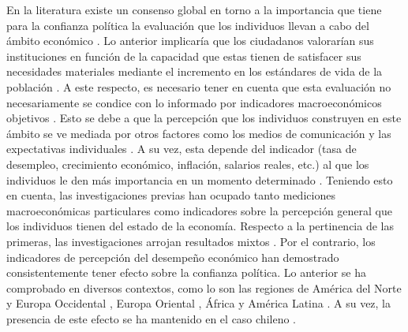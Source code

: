 \documentclass[12pt,twoside]{templates/facsothesis}
\begin{document}
En la literatura existe un consenso global en torno a la importancia que tiene para la confianza política la evaluación que los individuos llevan a cabo del ámbito económico \citep{eastonReassessmentConceptPolitical1975, leeEconomicPerformanceIncome2020, mishlerWhatAreOrigins2001, norrisDemocraticDeficitCritical2011, oskarssonGeneralizedTrustPolitical2010, vandermeerEconomicPerformancePolitical2018, wangGovernmentPerformanceCorruption2016}. Lo anterior implicaría que los ciudadanos valorarían sus instituciones en función de la capacidad que estas tienen de satisfacer sus necesidades materiales mediante el incremento en los estándares de vida de la población \citep{quarantaDoesEconomyReally2016, thomassenSupportDemocraticValues1998, mcallisterEconomicPerformanceGovernments1999}. A este respecto, es necesario tener en cuenta que esta evaluación no necesariamente se condice con lo informado por indicadores macroeconómicos objetivos \citep{vandermeerEconomicPerformancePolitical2018}. Esto se debe a que la percepción que los individuos construyen en este ámbito se ve mediada por otros factores como los medios de comunicación y las expectativas individuales \citep{mcallisterEconomicPerformanceGovernments1999}. A su vez, esta depende del indicador (tasa de desempleo, crecimiento económico, inflación, salarios reales, etc.) al que los individuos le den más importancia en un momento determinado \citep{daltonDemocraticChallengesDemocratic2004}. Teniendo esto en cuenta, las investigaciones previas han ocupado tanto mediciones macroeconómicas particulares como indicadores sobre la percepción general que los individuos tienen del estado de la economía. Respecto a la pertinencia de las primeras, las investigaciones arrojan resultados mixtos \citep{andersonCorruptionPoliticalAllegiances2003, leeEconomicPerformanceIncome2020, mishlerWhatAreOrigins2001, vandermeerPoliticalTrustEvaluation2017}. Por el contrario, los indicadores de percepción del desempeño económico han demostrado consistentemente tener efecto sobre la confianza política. Lo anterior se ha comprobado en diversos contextos, como lo son las regiones de América del Norte y Europa Occidental \citep{oskarssonGeneralizedTrustPolitical2010, torcalDeclinePoliticalTrust2014a}, Europa Oriental \citep{mishlerWhatAreOrigins2001}, África \citep{stoyanTrustGovernmentInstitutions2016} y América Latina \citep{bargstedPoliticalTrustLatin2017, mainwaringStateDeficienciesParty2006, mattesSocialPoliticalTrust2018, stoyanTrustGovernmentInstitutions2016, torcalConfianzaPoliticaEuropa2015}. A su vez, la presencia de este efecto se ha mantenido en el caso chileno \citep{riffoQueInfluyeConfianza2019, saldanazunigaConfianzaInstitucionesPoliticas2019, segoviaMalaiseDemocracyChile2016}.
\end{document}
